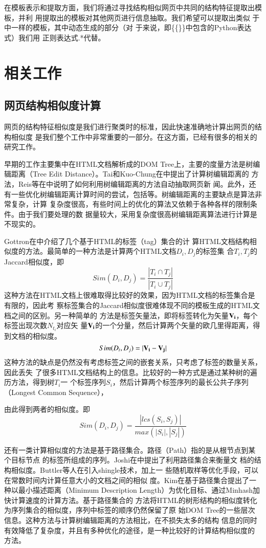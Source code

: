在模板表示和提取方面，我们将通过寻找结构相似网页中共同的结构特征提取出模板，并利
用提取出的模板对其他网页进行信息抽取。我们希望可以提取出类似
于中一样的模板，其中动态生成的部分（对
于来说，即{\{\{\}\}}中包含的Python表达式）我们用
正则表达式{.*}代替。
\section{相关工作}
\label{sec:relatedwork}

\subsection{网页结构相似度计算}
\label{sec:relatedwork:sim}
网页的结构特征相似度是我们进行聚类时的标准，因此快速准确地计算出网页的结构相似度
是我们整个工作中非常重要的一部分。在这方面，已经有很多的相关的研究工作。

早期的工作主要集中在HTML文档解析成的DOM Tree上，主要的度量方法是树编辑距离（Tree
Edit Distance）。Tai和Kuo-Chung在\cite{tai1979tree}中提出了计算树编辑距离的
方法，Reis等在\cite{reisauto}中说明了如何利用树编辑距离的方法自动抽取网页新
闻。此外，还有一些优化树编辑距离计算时间的尝试，包括\cite{zhang1989simple,
  dubiner1994faster,touzet2005linear}等。树编辑距离的主要缺点是算法非常复杂，计算
复杂度很高，有些时间上的优化的算法又依赖于各种各样的限制条件。由于我们要处理的数
据量较大，采用复杂度很高树编辑距离算法进行计算是不现实的。

Gottron在\cite{GottronCluster}中介绍了几个基于HTML的标签（tag）集合的计
算HTML文档结构相似度的方法。最简单的一种方法是计算两个HTML文档$D_i,D_{j}$的标签集
合$T_i, T_j$的Jaccard相似度，即
\[
Sim(D_i,D_j)=\frac{|T_i \cap T_j|}{|T_i \cup T_j|}
\]
这种方法在HTML文档上很难取得比较好的效果，因为HTML文档的标签集合是有限的，因此考
察标签集合的Jaccard相似度很难体现不同的模板生成的HTML文档之间的区别。另一种简单的
方法是标签矢量法，即将标签转化为矢量$\mathbf{\bm{V_i}}$，每个标签出现次数$N_{t_i}$对应矢
量$\mathbf{\bm{V_i}}$的一个分量，然后计算两个矢量的欧几里得距离，得到文档的相似度。
\[
Sim(D_i,D_j)=|\mathbf{\bm{V_i}}-\mathbf{\bm{V_j}}|
\]
这种方法的缺点是仍然没有考虑标签之间的嵌套关系，只考虑了标签的数量关系，因此丢失
了很多HTML文档结构上的信息。比较好的一种方式是通过某种树的遍历方法，得到树$T_i$一
个标签序列$S_i$，然后计算两个标签序列的最长公共子序列（Longest Common Sequence），

由此得到两者的相似度。即
\[
Sim(D_i,D_j)=\frac{|lcs(S_i,S_j)|}{max(|S_i|,|S_j|)}
\]

还有一类计算相似度的方法是基于路径集合。路径（Path）指的是从根节点到某个目标节点
的标签所组成的序列。Joshi在\cite{joshi2003bag}中提出了利用路径集合来衡量文
档的结构相似度。Buttler等人在\cite{buttler2004short}引入shingle技术，加上一
些随机取样等优化手段，可以在常数时间内计算任意大小的文档之间的相似
度。Kim在\cite{KimText}基于路径集合提出了一种以最小描述距离（Minimum
Description Length）为优化目标、通过Minhash加快计算速度的计算方法。基于路径集合的
方法将HTML的树形结构的相似度转化为序列集合的相似度，序列中标签的顺序仍然保留了原
始DOM Tree的一些层次信息。这种方法与计算树编辑距离的方法相比，在不损失太多的结构
信息的同时有效降低了复杂度，并且有多种优化的途径，是一种比较好的计算结构相似度的
方法。

